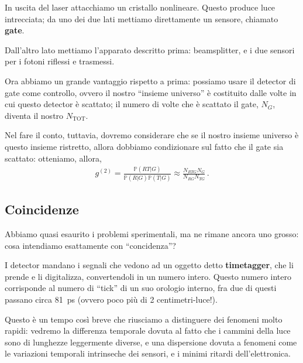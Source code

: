 \documentclass{article}
\begin{document}

In uscita del laser attacchiamo un cristallo nonlineare. 
Questo produce luce intrecciata; da uno dei due lati mettiamo direttamente un sensore, chiamato \textbf{gate}. 

Dall'altro lato mettiamo l'apparato descritto prima: beamsplitter, e i due sensori per i fotoni riflessi e trasmessi.


Ora abbiamo un grande vantaggio rispetto a prima: possiamo usare il detector di gate come controllo, ovvero il nostro ``insieme universo'' è costituito dalle volte in cui questo detector è scattato; il numero di volte che è scattato il gate, \(N_G\), diventa il nostro \(N _{\text{TOT}} \).

Nel fare il conto, tuttavia, dovremo considerare che se il nostro insieme universo è questo insieme ristretto, allora dobbiamo condizionare sul fatto che il gate sia scattato: otteniamo, allora, 
%
\begin{align}
g^{(2)} = \frac{\mathbb{P}(RT | G)}{\mathbb{P}(R|G) \mathbb{P}(T|G)}
\approx \frac{N_{RTG} N_G}{N_{RG} N_{TG}}
\,.
\end{align}

\subsection{Coincidenze}

Abbiamo quasi esaurito i problemi sperimentali, ma ne rimane ancora uno grosso: cosa intendiamo esattamente con ``concidenza''? 

I detector mandano i segnali che vedono ad un oggetto detto \textbf{timetagger}, che li prende e li digitalizza, convertendoli in un numero intero. Questo numero intero corrisponde al numero di ``tick'' di un suo orologio interno, fra due di questi passano circa \SI{81}{ps} (ovvero poco più di  2 centimetri-luce!).

Questo è un tempo così breve che riusciamo a distinguere dei fenomeni molto rapidi: vedremo la differenza temporale dovuta al fatto che i cammini della luce sono di lunghezze leggermente diverse, e una dispersione dovuta a fenomeni come le variazioni temporali intrinseche dei sensori, e i minimi ritardi dell'elettronica.
\end{document}
